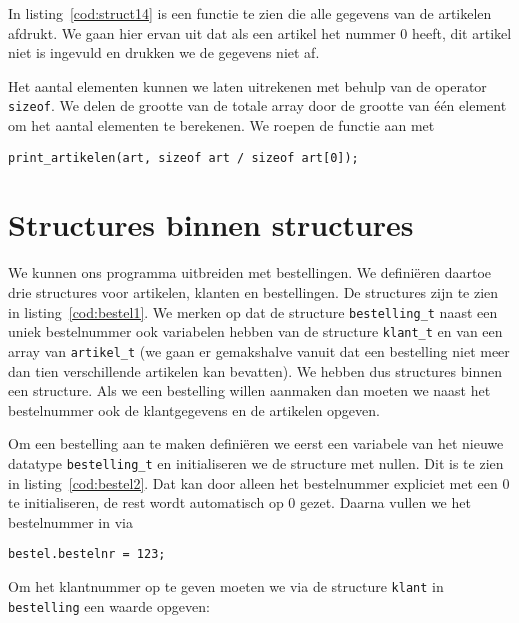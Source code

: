 In listing~\ref{cod:struct14} is een functie te zien die alle gegevens van de artikelen afdrukt. We gaan hier ervan uit dat als een artikel het nummer 0 heeft, dit artikel niet is ingevuld en drukken we de gegevens niet af. 


Het aantal elementen kunnen we laten uitrekenen met behulp van de operator \texttt{sizeof}. We delen de grootte van de totale array door de grootte van één element om het aantal elementen te berekenen.
We roepen de functie aan met

\hspace*{1em}\texttt{print\_artikelen(art, sizeof art / sizeof art[0]);}


\section{Structures binnen structures}
We kunnen ons programma uitbreiden met bestellingen. We definiëren daartoe drie structures voor artikelen, klanten en bestellingen. De structures zijn te zien in listing~\ref{cod:bestel1}. We merken op dat de structure \texttt{bestelling\_t} naast een uniek bestelnummer ook variabelen hebben van de structure \texttt{klant\_t} en van een array van \texttt{artikel\_t} (we gaan er gemakshalve vanuit dat een bestelling niet meer dan tien verschillende artikelen kan bevatten). We hebben dus structures binnen een structure. Als we een bestelling willen aanmaken dan moeten we naast het bestelnummer ook de klantgegevens en de artikelen opgeven.


Om een bestelling aan te maken definiëren we eerst een variabele van het nieuwe datatype \texttt{bestelling\_t} en initialiseren we de structure met nullen. Dit is te zien in listing~\ref{cod:bestel2}. Dat kan door alleen het bestelnummer expliciet met een 0 te initialiseren, de rest wordt automatisch op 0 gezet. Daarna vullen we het bestelnummer in via

\hspace*{1em}\texttt{bestel.bestelnr = 123;}

Om het klantnummer op te geven moeten we via de structure \texttt{klant} in \texttt{bestelling} een waarde opgeven:

